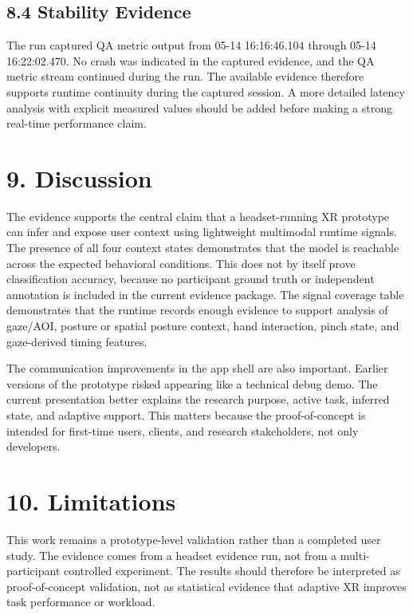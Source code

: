 \documentclass[
  10pt,
]{article}
\begin{document}
\subsection{8.4 Stability Evidence}\label{stability-evidence}

The run captured QA metric output from 05-14 16:16:46.104 through 05-14
16:22:02.470. No crash was indicated in the captured evidence, and the
QA metric stream continued during the run. The available evidence
therefore supports runtime continuity during the captured session. A
more detailed latency analysis with explicit measured values should be
added before making a strong real-time performance claim.

\section{9. Discussion}\label{discussion}

The evidence supports the central claim that a headset-running XR
prototype can infer and expose user context using lightweight multimodal
runtime signals. The presence of all four context states demonstrates
that the model is reachable across the expected behavioral conditions.
This does not by itself prove classification accuracy, because no
participant ground truth or independent annotation is included in the
current evidence package. The signal coverage table demonstrates that
the runtime records enough evidence to support analysis of gaze/AOI,
posture or spatial posture context, hand interaction, pinch state, and
gaze-derived timing features.

The communication improvements in the app shell are also important.
Earlier versions of the prototype risked appearing like a technical
debug demo. The current presentation better explains the research
purpose, active task, inferred state, and adaptive support. This matters
because the proof-of-concept is intended for first-time users, clients,
and research stakeholders, not only developers.

\section{10. Limitations}\label{limitations}

This work remains a prototype-level validation rather than a completed
user study. The evidence comes from a headset evidence run, not from a
multi-participant controlled experiment. The results should therefore be
interpreted as proof-of-concept validation, not as statistical evidence
that adaptive XR improves task performance or workload.
\end{document}
